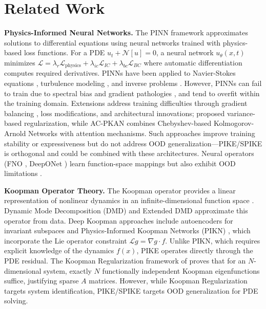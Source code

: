 \documentclass{article}
\theoremstyle{remark}
\begin{document}
\section{Related Work}
\label{sec:related}

\textbf{Physics-Informed Neural Networks.} The PINN framework \citep{raissi2019pinn} approximates solutions to differential equations using neural networks trained with physics-based loss functions. For a PDE $u_t + \mathcal{N}[u] = 0$, a neural network $u_\theta(x, t)$ minimizes $\mathcal{L} = \lambda_r\mathcal{L}_{\text{physics}} + \lambda_{ic}\mathcal{L}_{IC} + \lambda_{bc}\mathcal{L}_{BC}$ where automatic differentiation computes required derivatives. PINNs have been applied to Navier-Stokes equations \citep{raissi2019pinn}, turbulence modeling \citep{wang2021understanding}, and inverse problems \citep{raissi2020hidden}. However, PINNs can fail to train due to spectral bias and gradient pathologies \citep{wang2022pinnsfail}, and tend to overfit within the training domain. Extensions address training difficulties through gradient balancing \citep{wang2021understanding}, loss modifications, and architectural innovations; \citet{hanna2025variance} proposed variance-based regularization, while AC-PKAN \citep{zhang2025acpkan} combines Chebyshev-based Kolmogorov-Arnold Networks with attention mechanisms. Such approaches improve training stability or expressiveness but do not address OOD generalization---PIKE/SPIKE is orthogonal and could be combined with these architectures. Neural operators (FNO \citep{li2021fno}, DeepONet \citep{lu2021deeponet}) learn function-space mappings but also exhibit OOD limitations \citep{zhang2024dualbranchOOD, wu2025temporaloperator}.

\textbf{Koopman Operator Theory.} The Koopman operator provides a linear representation of nonlinear dynamics in an infinite-dimensional function space \citep{brunton2022modern}. Dynamic Mode Decomposition (DMD) \citep{rowley2009spectral} and Extended DMD \citep{williams2015edmd} approximate this operator from data. Deep Koopman approaches include autoencoders for invariant subspaces \citep{lusch2018deep, azencot2020forecasting} and Physics-Informed Koopman Networks (PIKN) \citep{liu2022physicskoopman}, which incorporate the Lie operator constraint $\mathcal{L}g = \nabla g \cdot f$. Unlike PIKN, which requires explicit knowledge of the dynamics $f(x)$, PIKE operates directly through the PDE residual. The Koopman Regularization framework of \citet{cohen2025koopman} proves that for an $N$-dimensional system, exactly $N$ functionally independent Koopman eigenfunctions suffice, justifying sparse $A$ matrices. However, while Koopman Regularization targets system identification, PIKE/SPIKE targets OOD generalization for PDE solving.
\end{document}

